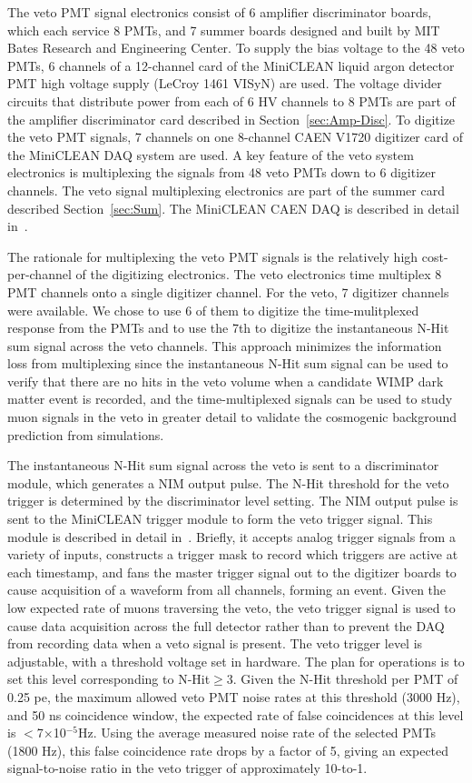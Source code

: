 \documentclass[review,number,sort&compress]{elsarticle}
\begin{document}
The veto PMT signal electronics consist of 6 amplifier discriminator
boards, which each service 8 PMTs, and 7 summer boards designed and
built by MIT Bates Research and Engineering Center.  To supply the
bias voltage to the 48 veto PMTs, 6 channels of a 12-channel card of
the MiniCLEAN liquid argon detector PMT high voltage supply (LeCroy
1461 VISyN) are used. The voltage divider circuits that distribute
power from each of 6 HV channels to 8 PMTs are part of the amplifier
discriminator card described in Section~\ref{sec:Amp-Disc}.  To
digitize the veto PMT signals, 7 channels on one 8-channel CAEN V1720
digitizer card of the MiniCLEAN DAQ system are used.  A key feature of
the veto system electronics is multiplexing the signals from 48 veto
PMTs down to 6 digitizer channels.  The veto signal multiplexing
electronics are part of the summer card described
Section~\ref{sec:Sum}. The MiniCLEAN CAEN DAQ is described in detail
in~\cite{ref:gastler_thesis}.

The rationale for multiplexing the veto PMT signals is the relatively
high cost-per-channel of the digitizing electronics.  The veto
electronics time multiplex 8 PMT channels onto a single digitizer
channel. For the veto, 7 digitizer channels were available. We chose
to use 6 of them to digitize the time-mulitplexed response from the
PMTs and to use the 7th to digitize the instantaneous N-Hit sum signal
across the veto channels.  This approach minimizes the information
loss from multiplexing since the instantaneous N-Hit sum signal can be
used to verify that there are no hits in the veto volume when a
candidate WIMP dark matter event is recorded, and the time-multiplexed
signals can be used to study muon signals in the veto in greater
detail to validate the cosmogenic background prediction from simulations.

The instantaneous N-Hit sum signal across the veto is sent to a
discriminator module, which generates a NIM output pulse.  The N-Hit
threshold for the veto trigger is determined by the discriminator
level setting.  The NIM output pulse is sent to the MiniCLEAN trigger
module to form the veto trigger signal.  This module is described in
detail in~\cite{ref:gastler_thesis}.  Briefly, it accepts analog
trigger signals from a variety of inputs, constructs a trigger mask to
record which triggers are active at each timestamp, and fans the master
trigger signal out to the digitizer boards to cause acquisition of a
waveform from all channels, forming an event.  Given the low expected
rate of muons traversing the veto, the veto trigger signal is used to
cause data acquisition across the full detector rather than to prevent
the DAQ from recording data when a veto signal is present.  The veto
trigger level is adjustable, with a threshold voltage set in hardware.
The plan for operations is to set this level corresponding to
N-Hit$\ge$3.  Given the N-Hit threshold per PMT of 0.25 pe, the
maximum allowed veto PMT noise rates at this threshold (3000 Hz), and
50 ns coincidence window, the expected rate of false coincidences at
this level is $<$7$\times$10$^{-5}$Hz.  Using the average measured
noise rate of the selected PMTs (1800 Hz), this false coincidence rate
drops by a factor of 5, giving an expected signal-to-noise ratio in
the veto trigger of approximately 10-to-1.
\end{document}
